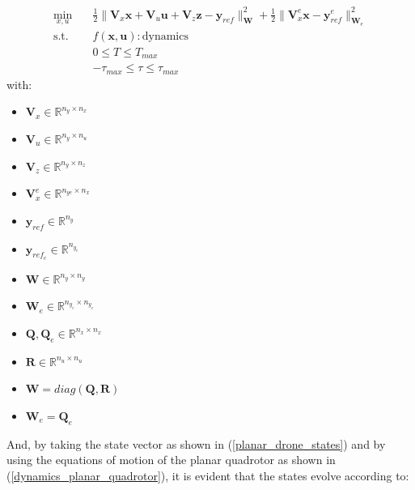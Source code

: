\documentclass{thesisreport}
\begin{document}
	\begin{equation}\label{mpc_optimization_problem_planar_quadrotor}
\begin{aligned}
            \min_{x,u} \quad & \frac{1}{2}\|\bm{V}_x \bm{x} + \bm{V}_u \bm{u} + \bm{V}_z \bm{z} - \bm{y}_{ref}\|^2_{\bm{W}} + \frac{1}{2}\|\bm{V}_x^e \bm{x} - \bm{y}_{ref}^e \|^2_{\bm{W}_e} \\
            \textrm{s.t.} \quad & f(\bm{x},\bm{u}):\text{dynamics} \\
            & 0 \leq T \leq T_{max} \\
            & - \tau_{max} \leq \tau \leq \tau_{max}
        \end{aligned}
\end{equation}
with: 
\begin{multicols}{3}
\begin{itemize}
	\item $\bm{V}_x \in \mathbb{R}^{n_y \times n_x}$
	\item $\bm{V}_u \in \mathbb{R}^{n_y \times n_u}$ 
	\item $\bm{V}_z \in \mathbb{R}^{n_y \times n_z}$
	\item $\bm{V}_x^e \in \mathbb{R}^{n_{ye}\times n_x}$
\end{itemize}
\columnbreak
\begin{itemize}
	\item $\bm{y}_{ref} \in \mathbb{R}^{n_y}$
	\item $\bm{y}_{ref_e} \in \mathbb{R}^{n_{y_e}}$
	\item $\bm{W} \in \mathbb{R}^{n_y \times n_y}$
	\item $\bm{W}_e \in \mathbb{R}^{n_{y_e} \times n_{y_e}}$
\end{itemize}
\columnbreak
\begin{itemize}
	\item $\bm{Q},\bm{Q}_e \in \mathbb{R}^{n_x \times n_x}$
	\item $\bm{R} \in \mathbb{R}^{n_u \times n_u}$
	\item $\bm{W} = diag(\bm{Q},\bm{R}) $
	\item $\bm{W}_e = \bm{Q}_e $
\end{itemize}
\end{multicols}

And, by taking the state vector as shown in (\ref{planar_drone_states}) and by using the equations of motion of the planar quadrotor as shown in (\ref{dynamics_planar_quadrotor}), it is evident that the states evolve according to:
\end{document}
